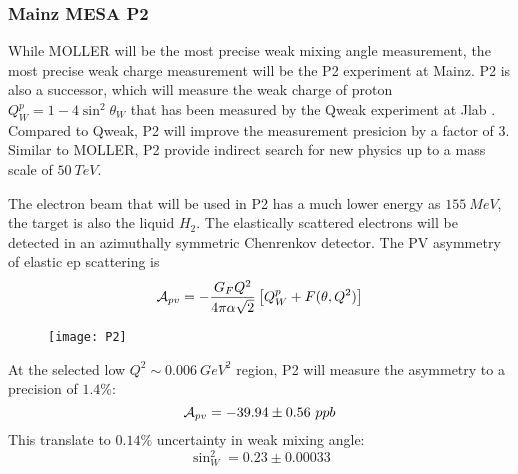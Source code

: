 \subsubsection{Mainz MESA P2}
While MOLLER will be the most precise weak mixing angle measurement, the most
precise weak charge measurement will be the P2 experiment at Mainz.
P2 is also a successor, which will measure the weak charge of proton $Q_W^p = 1 - 4\sin^2\theta_W$
that has been measured by the Qweak experiment at Jlab \cite{???}. Compared to
Qweak, P2 will improve the measurement presicion by a factor of 3.
Similar to MOLLER, P2 provide indirect search for new physics up to a mass scale
of $50\ TeV$.

The electron beam that will be used in P2 has a much lower energy as $155\ MeV$, 
the target is also the liquid $H_2$. The elastically scattered electrons will
be detected in an azimuthally symmetric Chenrenkov detector. The PV asymmetry
of elastic ep scattering is
\begin{equation}
    \mathcal{A}_{pv} = -\frac{G_F Q^2}{4\pi\alpha\sqrt{2}} \left[ Q_W^p + F(\theta, Q^2) \right]
\end{equation}
\begin{figure}
    \centering
    \texttt{[image: P2]}
\end{figure}
At the selected low $Q^2 \sim 0.006 \ GeV^2$ region, P2 will measure the asymmetry
to a precision of $1.4\%$:
\begin{equation}
    \mathcal{A}_{pv} = -39.94 \pm 0.56\ ppb
\end{equation}
This translate to $0.14\%$ uncertainty in weak mixing angle:
\begin{equation}
    \sin^2_W = 0.23 \pm 0.00033
\end{equation}
